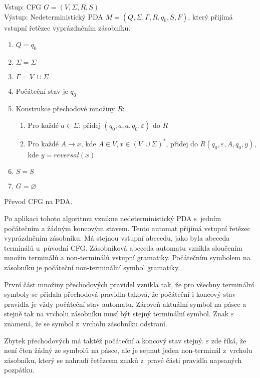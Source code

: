 \begin{framed}
	Vstup: CFG \(G = (V,\Sigma, R, S) \)\\
	Výstup: Nedeterministický PDA \(M = (Q, \Sigma, \Gamma, R, q_0, S, F) \), který přijímá vstupní řetězec vyprázdněním zásobníku. 
	\begin{enumerate}
		\item \(Q = {q_0}\)
		\item \(\Sigma = \Sigma\)
		\item \(\Gamma = V~\cup \Sigma \)
		\item Počáteční stav je \(q_0\)
		\item Konstrukce přechodové množiny \( R \):
		\begin{enumerate}
			\item Pro každé $a \in \Sigma$: přidej $(q_0,a,a,q_0,\varepsilon)$ do $R$
			\item Pro každé $A \rightarrow x$, kde $A \in V, x \in (V~\cup \Sigma)^*$, přidej do $R (q_0, \varepsilon, A, q_0, y)$, 
			kde $y = reversal(x)$
		\end{enumerate}
		\item \(S = S\)
		\item $G = \varnothing$
	\end{enumerate}
\end{framed}
\begin{myAlgorithm}
	Převod CFG na PDA.
\end{myAlgorithm}

Po aplikaci tohoto algoritmu vznikne nedeterministický PDA s~jedním počátečním a žádným koncovým stavem. Tento automat přijímá vstupní řetězec vyprázdněním zásobníku. Má stejnou vstupní abecedu, jako byla abeceda terminálů u~původní CFG. Zásobníková abeceda automatu vznikla sloučením množin terminálů a non-terminálů vstupní gramatiky. Počátečním symbolem na zásobníku je počáteční non-terminální symbol gramatiky. 

První část množiny přechodových pravidel vznikla tak, že pro všechny terminální symboly se přidala přechodová pravidla taková, že počáteční i koncový stav pravidla je vždy počáteční stav automatu. Zároveň aktuální symbol na pásce a stejně tak na vrcholu zásobníku musí být stejný terminální symbol. Znak $\varepsilon$ znamená, že se symbol z~vrcholu zásobníku odstraní. 

Zbytek přechodových má taktéž počáteční a koncový stav stejný. $\varepsilon$ zde říká, že není čten žádný ze symbolů na pásce, ale je sejmut jeden non-terminál z~vrcholu zásobníku, který se nahradí řetězcem znaků z~pravé části pravidla napsaných pozpátku.  

